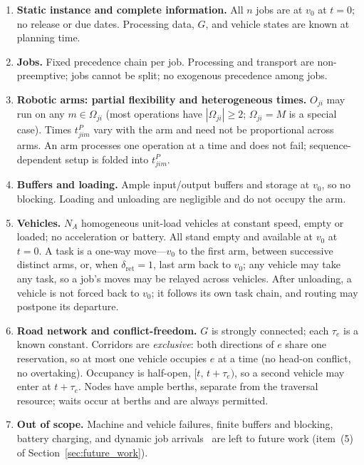 \documentclass[manuscript,screen,review]{acmart}
\begin{document}
\begin{enumerate}[label=\textbf{A\arabic*.},leftmargin=*,topsep=2pt,itemsep=1pt]
\item \textbf{Static instance and complete information.} All $n$ jobs are at $v_0$ at $t=0$; no release or due dates. Processing data, $G$, and vehicle states are known at planning time.

\item \textbf{Jobs.} Fixed precedence chain per job. Processing and transport are non-preemptive; jobs cannot be split; no exogenous precedence among jobs.

\item \textbf{Robotic arms: partial flexibility and heterogeneous times.} $O_{ji}$ may run on any $m\in\Omega_{ji}$ (most operations have $|\Omega_{ji}|\ge 2$; $\Omega_{ji}=M$ is a special case). Times $t^P_{jim}$ vary with the arm and need not be proportional across arms. An arm processes one operation at a time and does not fail; sequence-dependent setup is folded into $t^P_{jim}$.

\item \textbf{Buffers and loading.} Ample input/output buffers and storage at $v_0$, so no blocking. Loading and unloading are negligible and do not occupy the arm.

\item \textbf{Vehicles.} $N_A$ homogeneous unit-load vehicles at constant speed, empty or loaded; no acceleration or battery. All stand empty and available at $v_0$ at $t=0$. A task is a one-way move---$v_0$ to the first arm, between successive distinct arms, or, when $\delta_{\mathrm{ret}}=1$, last arm back to $v_0$; any vehicle may take any task, so a job's moves may be relayed across vehicles. After unloading, a vehicle is not forced back to $v_0$; it follows its own task chain, and routing may postpone its departure.

\item \textbf{Road network and conflict-freedom.} $G$ is strongly connected; each $\tau_e$ is a known constant. Corridors are \emph{exclusive}: both directions of $e$ share one reservation, so at most one vehicle occupies $e$ at a time (no head-on conflict, no overtaking). Occupancy is half-open, $[t,\,t+\tau_e)$, so a second vehicle may enter at $t+\tau_e$. Nodes have ample berths, separate from the traversal resource; waits occur at berths and are always permitted.

\item \textbf{Out of scope.} Machine and vehicle failures, finite buffers and blocking, battery charging, and dynamic job arrivals~\cite{gui2023dynamic,zhao2026deep} are left to future work (item~(5) of Section~\ref{sec:future_work}).
\end{enumerate}
\end{document}
